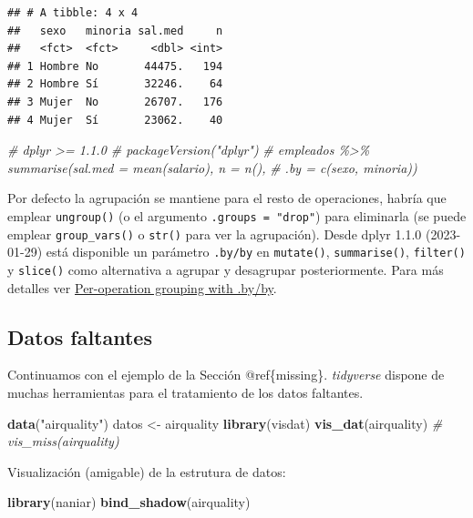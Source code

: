\documentclass[
]{book}
\newenvironment{Shaded}{\begin{snugshade}}{\end{snugshade}}
\newcommand{\CommentTok}[1]{\textcolor[rgb]{0.56,0.35,0.01}{\textit{#1}}}
\newcommand{\FunctionTok}[1]{\textcolor[rgb]{0.13,0.29,0.53}{\textbf{#1}}}
\newcommand{\NormalTok}[1]{#1}
\newcommand{\OtherTok}[1]{\textcolor[rgb]{0.56,0.35,0.01}{#1}}
\newcommand{\StringTok}[1]{\textcolor[rgb]{0.31,0.60,0.02}{#1}}
\begin{document}
\begin{verbatim}
## # A tibble: 4 x 4
##   sexo   minoria sal.med     n
##   <fct>  <fct>     <dbl> <int>
## 1 Hombre No       44475.   194
## 2 Hombre Sí       32246.    64
## 3 Mujer  No       26707.   176
## 4 Mujer  Sí       23062.    40
\end{verbatim}

\begin{Shaded}
\begin{Highlighting}[]
\CommentTok{\# dplyr \textgreater{}= 1.1.0 \# packageVersion("dplyr")}
\CommentTok{\# empleados \%\textgreater{}\% summarise(sal.med = mean(salario), n = n(), }
\CommentTok{\#                         .by = c(sexo, minoria))}
\end{Highlighting}
\end{Shaded}

Por defecto la agrupación se mantiene para el resto de operaciones, habría que emplear \texttt{ungroup()} (o el argumento \texttt{.groups\ =\ "drop"}) para eliminarla (se puede emplear \texttt{group\_vars()} o \texttt{str()} para ver la agrupación).
Desde dplyr 1.1.0 (2023-01-29) está disponible un parámetro \texttt{.by/by} en \texttt{mutate()}, \texttt{summarise()}, \texttt{filter()} y \texttt{slice()} como alternativa a agrupar y desagrupar posteriormente.
Para más detalles ver \href{https://dplyr.tidyverse.org/reference/dplyr_by.html}{Per-operation grouping with .by/by}.

\hypertarget{tidyr-missing}{%
\subsection{Datos faltantes}\label{tidyr-missing}}

Continuamos con el ejemplo de la Sección @ref\{missing\}.
\emph{tidyverse} dispone de muchas herramientas para el tratamiento de los datos faltantes.

\begin{Shaded}
\begin{Highlighting}[]
\FunctionTok{data}\NormalTok{(}\StringTok{"airquality"}\NormalTok{)}
\NormalTok{datos }\OtherTok{\textless{}{-}}\NormalTok{ airquality}
\FunctionTok{library}\NormalTok{(visdat)}
\FunctionTok{vis\_dat}\NormalTok{(airquality)}
\CommentTok{\# vis\_miss(airquality)}
\end{Highlighting}
\end{Shaded}

Visualización (amigable) de la estrutura de datos:

\begin{Shaded}
\begin{Highlighting}[]
\FunctionTok{library}\NormalTok{(naniar)}
\FunctionTok{bind\_shadow}\NormalTok{(airquality)}
\end{Highlighting}
\end{Shaded}
\end{document}
